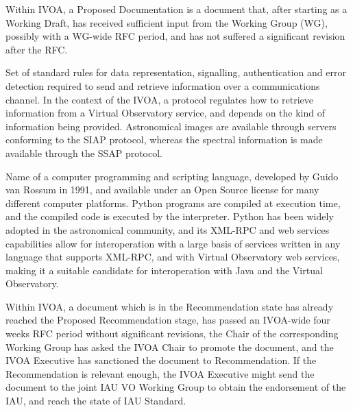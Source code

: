 {
    	Within \gls{IVOA}, a Proposed Documentation is a document that,
        after starting as a Working Draft, has received sufficient
        input from the \gls{Working Group} (WG), possibly with a
        WG-wide \gls{RFC} period, and has not suffered a significant
        revision after the RFC.
}

{
    	Set of standard rules for data representation, signalling,
        authentication and error detection required to send and
        retrieve information over a communications channel. In the
        context of the \gls{IVOA}, a protocol regulates how to retrieve
        information from a \gls{Virtual Observatory} service, and
        depends on the kind of information being provided. Astronomical
        images are available through servers conforming to the
        \gls{SIAP} protocol, whereas the spectral information is made
        available through the \gls{SSAP} protocol.
}

{
    	Name of a computer programming and scripting language,
        developed by Guido van Rossum in 1991, and available under an
        \gls{Open Source} license for many different computer
        platforms. Python programs are compiled at execution time, and
        the compiled code is executed by the interpreter. Python has
        been widely adopted in the astronomical community, and its
        \gls{XML-RPC} and \gls{web services} capabilities allow for
        interoperation with a large basis of services written in any
        language that supports \gls{XML-RPC}, and with \gls{Virtual
        Observatory} web services, making it a suitable candidate for
        interoperation with Java and the Virtual Observatory.
}

{
    	Within \gls{IVOA}, a document which is in the Recommendation
        state has already reached the \gls{Proposed Recommendation}
        stage, has passed an IVOA-wide four weeks RFC period without
        significant revisions, the Chair of the corresponding
        \gls{Working Group} has asked the IVOA Chair to promote the
        document, and the \gls{IVOA Executive} has sanctioned the
        document to \gls{Recommendation}. If the Recommendation is
        relevant enough, the IVOA Executive might send the document to
        the joint IAU VO Working Group to obtain the endorsement of the
        \gls{IAU}, and reach the state of \gls{IAU Standard}.
}

